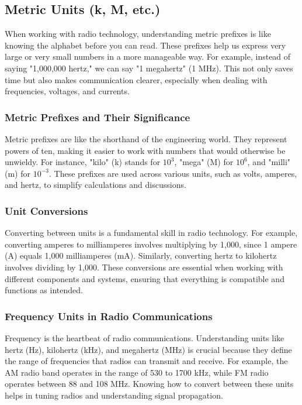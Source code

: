 \subsection{Metric Units (k, M, etc.)}
\label{subsec:metric}

When working with radio technology, understanding metric prefixes is like knowing the alphabet before you can read. These prefixes help us express very large or very small numbers in a more manageable way. For example, instead of saying "1,000,000 hertz," we can say "1 megahertz" (1 MHz). This not only saves time but also makes communication clearer, especially when dealing with frequencies, voltages, and currents.

\subsubsection*{Metric Prefixes and Their Significance}
Metric prefixes are like the shorthand of the engineering world. They represent powers of ten, making it easier to work with numbers that would otherwise be unwieldy. For instance, "kilo" (k) stands for $10^3$, "mega" (M) for $10^6$, and "milli" (m) for $10^{-3}$. These prefixes are used across various units, such as volts, amperes, and hertz, to simplify calculations and discussions.

\subsubsection*{Unit Conversions}
Converting between units is a fundamental skill in radio technology. For example, converting amperes to milliamperes involves multiplying by 1,000, since 1 ampere (A) equals 1,000 milliamperes (mA). Similarly, converting hertz to kilohertz involves dividing by 1,000. These conversions are essential when working with different components and systems, ensuring that everything is compatible and functions as intended.

\subsubsection*{Frequency Units in Radio Communications}
Frequency is the heartbeat of radio communications. Understanding units like hertz (Hz), kilohertz (kHz), and megahertz (MHz) is crucial because they define the range of frequencies that radios can transmit and receive. For example, the AM radio band operates in the range of 530 to 1700 kHz, while FM radio operates between 88 and 108 MHz. Knowing how to convert between these units helps in tuning radios and understanding signal propagation.

